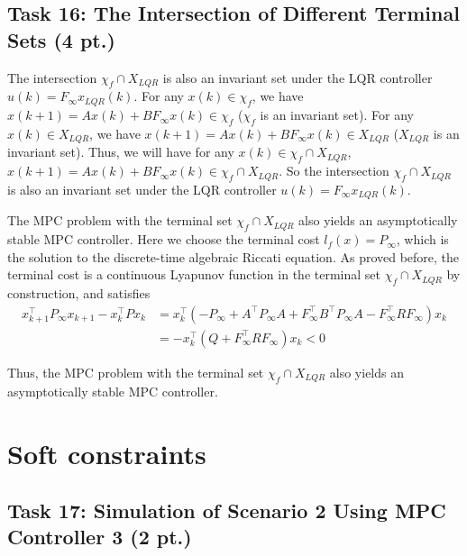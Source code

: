 \documentclass[a4paper,twoside,11pt]{article}
\numberwithin{equation}{section}
\begin{document}
\subsection{Task 16: The Intersection of Different Terminal Sets (4 pt.)}

The intersection $\chi_f\cap X_{LQR}$ is also an invariant set under the LQR controller $u(k) = F_\infty x_{LQR}(k)$. For any $x(k)\in \chi_f$, we have $x(k+1) = Ax(k)+BF_\infty x(k) \in \chi_f$ ($\chi_f$ is an invariant set). For any $x(k)\in X_{LQR}$, we have $x(k+1) = Ax(k)+BF_\infty x(k) \in X_{LQR}$ ($X_{LQR}$ is an invariant set). Thus, we will have for any $x(k)\in \chi_f\cap X_{LQR}$, $x(k+1) = Ax(k)+BF_\infty x(k) \in \chi_f\cap X_{LQR}$. So the intersection $\chi_f\cap X_{LQR}$ is also an invariant set under the LQR controller $u(k) = F_\infty x_{LQR}(k)$.

The MPC problem with the terminal set $\chi_f\cap X_{LQR}$ also yields an asymptotically stable MPC controller. Here we choose the terminal cost $l_f(x) = P_\infty$, which is the solution to the discrete-time algebraic Riccati equation. As proved before, the terminal cost is a continuous Lyapunov function in the terminal set $\chi_f\cap X_{LQR}$ by construction,  and satisfies
\begin{equation*}
    \begin{split}
        x^\top_{k+1} P_\infty x_{k+1}-x^\top_k P x_k &= x^\top_k(-P_\infty + A^\top P_\infty A + F_\infty^\top B^\top P_\infty A - F^\top_\infty R F_\infty)x_k \\
        &= -x^\top_k(Q + F^\top_\infty R F_\infty)x_k < 0
    \end{split}
\end{equation*}

Thus, the MPC problem with the terminal set $\chi_f\cap X_{LQR}$ also yields an asymptotically stable MPC controller. 

\newpage


\section{Soft constraints}

\subsection{Task 17: Simulation of Scenario 2 Using MPC Controller 3 (2 pt.)}
\end{document}
